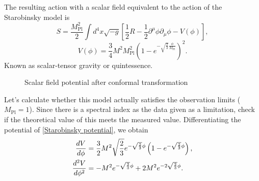 \documentclass[12pt]{article}
\numberwithin{equation}{section}
\begin{document}
The resulting action with a scalar field equivalent to the action of the Starobinsky model is
\begin{equation}
    S = \frac{M_{\textrm{Pl}}^2}{2}\int d^4 x \sqrt{-g}\left[ \frac{1}{2}R -\frac{1}{2}\partial^\mu \phi \partial_\mu \phi -V(\phi) \right],
\end{equation}
\begin{equation}\label{Starobinsky potential}
    V(\phi) = \frac{3}{4}M^2 M_{\textrm{Pl}}^2 \left( 1 -  e^{-\sqrt{\frac{2}{3}}\frac{\phi}{M_{\textrm{Pl}}}} \right)^2.
\end{equation}
Known as scalar-tensor gravity or quintessence.
\begin{figure}[H]
    \centering
    \caption{Scalar field potential after conformal transformation}
\end{figure}
\noindent Let's calculate whether this model actually satisfies the observation limits ($M_{\textrm{Pl}} = 1$). Since there is a spectral index as the data given as a limitation, check if the theoretical value of this meets the measured value. Differentiating the potential of \eqref{Starobinsky potential}, we obtain
\begin{align}\label{potential different}
    \frac{dV}{d\phi} &= \frac{3}{2}M^2 \sqrt{\frac{2}{3}}e^{-\sqrt{\frac{2}{3}}\phi}\left( 1 - e^{-\sqrt{\frac{2}{3}}\phi} \right),\notag\\
    \frac{d^2 V}{d\phi^2} &= -M^2 e^{-\sqrt{\frac{2}{3}}\phi} + 2M^2 e^{-2\sqrt{\frac{2}{3}}\phi}.
\end{align}
\end{document}
